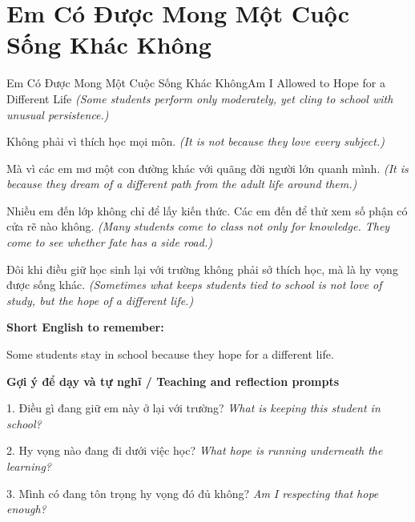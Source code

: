 \section{Em Có Được Mong Một Cuộc Sống Khác Không}
\begin{truyen}{Em Có Được Mong Một Cuộc Sống Khác Không}{Am I Allowed to Hope for a Different Life}
\textit{(Some students perform only moderately, yet cling to school with unusual persistence.)}

Không phải vì thích học mọi môn.
\textit{(It is not because they love every subject.)}

Mà vì các em mơ một con đường khác với quãng đời người lớn quanh mình.
\textit{(It is because they dream of a different path from the adult life around them.)}

Nhiều em đến lớp không chỉ để lấy kiến thức. Các em đến để thử xem số phận có cửa rẽ nào không.
\textit{(Many students come to class not only for knowledge. They come to see whether fate has a side road.)}

\end{truyen}

\begin{baihoc}
Đôi khi điều giữ học sinh lại với trường không phải sở thích học, mà là hy vọng được sống khác.
\textit{(Sometimes what keeps students tied to school is not love of study, but the hope of a different life.)}
\end{baihoc}

\begin{ghinhoanh}
\textbf{Short English to remember:}

Some students stay in school because they hope for a different life.

\end{ghinhoanh}

\begin{tuhocnhanh}
\textbf{Gợi ý để dạy và tự nghĩ / Teaching and reflection prompts}

1. Điều gì đang giữ em này ở lại với trường? \textit{What is keeping this student in school?}

2. Hy vọng nào đang đi dưới việc học? \textit{What hope is running underneath the learning?}

3. Mình có đang tôn trọng hy vọng đó đủ không? \textit{Am I respecting that hope enough?}
\end{tuhocnhanh}
\ngancach

